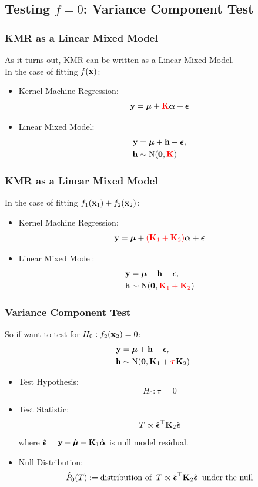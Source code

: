\documentclass{beamer}
\begin{document}
\subsection{Testing $f=0$: Variance Component Test}

\begin{frame}
\frametitle{KMR as a Linear Mixed Model}
As it turns out, KMR can be written as a Linear Mixed Model. \\
In the case of fitting $f({\bf x})$:
\begin{itemize}
\item Kernel Machine Regression:
$${\bf y}=\boldsymbol{\mu} + {\color{red}{\bf K}} \boldsymbol{\alpha} + \boldsymbol{\epsilon}$$
\item Linear Mixed Model:
\begin{align*}
{\bf y} &= \boldsymbol{\mu} + {\bf h} + \boldsymbol{\epsilon},\\
{\bf h} &\sim \mathrm{N}(\mathbf{0}, {\color{red}{\bf K}})
\end{align*}
\end{itemize}
\end{frame}

\begin{frame}
\frametitle{KMR as a Linear Mixed Model}
In the case of fitting $f_1({\bf x}_1) + f_2({\bf x}_2)$:
\begin{itemize}
\item Kernel Machine Regression:
$${\bf y}=\boldsymbol{\mu} + {\color{red}({\bf K}_1 + {\bf K}_2)}\boldsymbol{\alpha} + \boldsymbol{\epsilon}$$
\item Linear Mixed Model:
\begin{align*}
{\bf y} &= \boldsymbol{\mu} + {\bf h} + \boldsymbol{\epsilon},\\
{\bf h} &\sim \mathrm{N}(\mathbf{0}, {\color{red}{\bf K}_1 + {\bf K}_2})
\end{align*}
\end{itemize}
\end{frame}

\begin{frame}
\frametitle{Variance Component Test}
So if want to test for $H_0: f_2({\bf x}_2)=0$:
\begin{align*}
{\bf y} &= \boldsymbol{\mu} + {\bf h} + \boldsymbol{\epsilon},\\
{\bf h} &\sim \mathrm{N}(\mathbf{0}, {\bf K}_1 + {\color{red}\boldsymbol{\tau}}{\bf K}_2)
\end{align*}

\begin{itemize}
\item Test Hypothesis: $$H_0: \boldsymbol{\tau}=0$$
\item Test Statistic: $$T \propto \hat{\boldsymbol{\epsilon}}^\top {\bf K}_2 \hat{\boldsymbol{\epsilon}}$$
where $\hat{\boldsymbol{\epsilon}}={\bf y}-\hat{\boldsymbol{\mu}} - {\bf K}_1 \hat{\boldsymbol{\alpha}}$ is null model residual.
\item Null Distribution: 
$$\hat{P}_0(T):= \mbox{distribution of}\; \; T \propto \hat{\boldsymbol{\epsilon}}^\top {\bf K}_2 \hat{\boldsymbol{\epsilon}}\; \; \mbox{under the null}$$
\end{itemize}
\end{frame}
\end{document}
